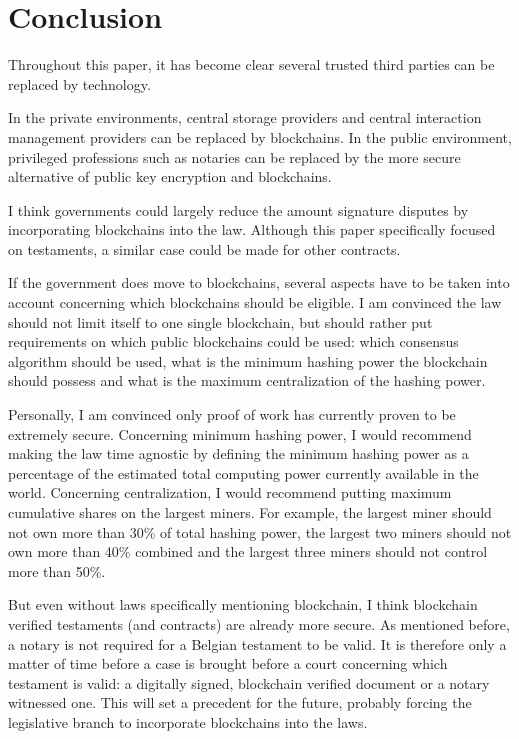 \chapter{Conclusion}

Throughout this paper, it has become clear several trusted third parties can be replaced by technology. 

In the private environments, central storage providers and central interaction management providers can be replaced by blockchains. In the public environment, privileged professions such as notaries can be replaced by the more secure alternative of public key encryption and blockchains.

I think governments could largely reduce the amount signature disputes by incorporating blockchains into the law. Although this paper specifically focused on testaments, a similar case could be made for other contracts. 

If the government does move to blockchains, several aspects have to be taken into account concerning which blockchains should be eligible. I am convinced the law should not limit itself to one single blockchain, but should rather put requirements on which public blockchains could be used: which consensus algorithm should be used, what is the minimum hashing power the blockchain should possess and what is the maximum centralization of the hashing power. 

Personally, I am convinced only proof of work has currently proven to be extremely secure. Concerning minimum hashing power, I would recommend making the law time agnostic by defining the minimum hashing power as a percentage of the estimated total computing power currently available in the world. Concerning centralization, I would recommend putting maximum cumulative shares on the largest miners. For example, the largest miner should not own more than 30\% of total hashing power, the largest two miners should not own more than 40\% combined and the largest three miners should not control more than 50\%. 

But even without laws specifically mentioning blockchain, I think blockchain verified testaments (and contracts) are already more secure. As mentioned before, a notary is not required for a Belgian testament to be valid. It is therefore only a matter of time before a case is brought before a court concerning which testament is valid: a digitally signed, blockchain verified document or a notary witnessed one. This will set a precedent for the future, probably forcing the legislative branch to incorporate blockchains into the laws.

